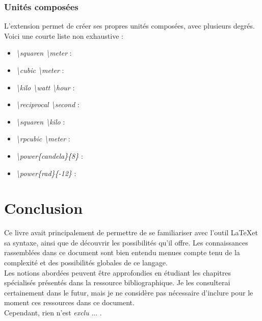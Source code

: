 \documentclass[a4paper, 10pt]{book}
\begin{document}
\subsection{Unités composées}
\vspace{0.5 cm}

L'extension permet de créer ses propres unités composées, avec plusieurs degrés. Voici une courte liste non exhaustive : \\

\begin{itemize}
    \item \textit{\textbackslash squaren \textbackslash meter} : \squaren\meter
    \item \textit{\textbackslash cubic \textbackslash meter} : \cubic\meter
    \item \textit{\textbackslash kilo \textbackslash watt \textbackslash hour} : \kilo \watt \hour
    \item \textit{\textbackslash reciprocal \textbackslash second} : \reciprocal \second
    \item \textit{\textbackslash squaren \textbackslash kilo} : \squaren \kilo
    \item \textit{\textbackslash rpcubic \textbackslash meter} : \rpcubic \meter
    \item \textit{\textbackslash power\{candela\}\{8\}} : 
    \item \textit{\textbackslash power\{rad\}\{-12\}} : 
\end{itemize}

\chapter{Conclusion}

Ce livre avait principalement de permettre de se familiariser avec l'outil \LaTeX et sa syntaxe, ainsi que de découvrir les possibilités qu'il offre. Les connaissances rassemblées dans ce document sont bien entendu menues compte tenu de la complexité et des possibilités globales de ce langage.\\
Les notions abordées peuvent être approfondies en étudiant les chapitres spécialisés présentés dans la ressource bibliographique. Je les consulterai certainement dans le futur, mais je ne considère pas nécessaire d'inclure pour le moment ces ressources dans ce document. \\
Cependant, rien n'est \textit{exclu} ... .



\nocite{LATEXWIKIVERSITE2028}


\backmatter




\tableofcontents
\end{document}
